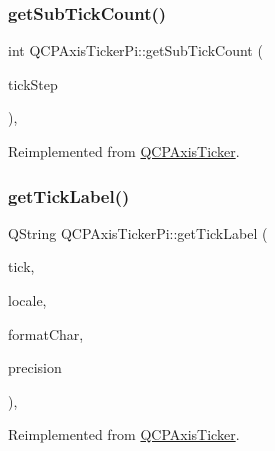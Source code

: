 \mbox{\label{class_q_c_p_axis_ticker_pi_a56c90f870da97c8670cfae4d04ff3ac7}} 
\subsubsection{\texorpdfstring{get\+Sub\+Tick\+Count()}{getSubTickCount()}}
{\footnotesize\ttfamily int Q\+C\+P\+Axis\+Ticker\+Pi\+::get\+Sub\+Tick\+Count (\begin{DoxyParamCaption}\item[{double}]{tick\+Step }\end{DoxyParamCaption})\hspace{0.3cm}{\ttfamily [protected]}, {\ttfamily [virtual]}}



Reimplemented from \hyperlink{class_q_c_p_axis_ticker_a4ccc403ced7a1457ce6ba293509933c8}{Q\+C\+P\+Axis\+Ticker}.

\mbox{\label{class_q_c_p_axis_ticker_pi_a9a087d931d4344b8a91d5cecceff7109}} 
\subsubsection{\texorpdfstring{get\+Tick\+Label()}{getTickLabel()}}
{\footnotesize\ttfamily Q\+String Q\+C\+P\+Axis\+Ticker\+Pi\+::get\+Tick\+Label (\begin{DoxyParamCaption}\item[{double}]{tick,  }\item[{const Q\+Locale \&}]{locale,  }\item[{Q\+Char}]{format\+Char,  }\item[{int}]{precision }\end{DoxyParamCaption})\hspace{0.3cm}{\ttfamily [protected]}, {\ttfamily [virtual]}}



Reimplemented from \hyperlink{class_q_c_p_axis_ticker_a8201eb4aa8be192bf786b126eb5ee089}{Q\+C\+P\+Axis\+Ticker}.

